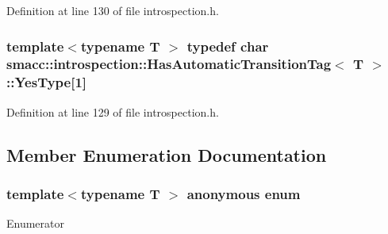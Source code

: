 Definition at line 130 of file introspection.\+h.

\subsubsection[{\texorpdfstring{Yes\+Type}{YesType}}]{\setlength{\rightskip}{0pt plus 5cm}template$<$typename T $>$ typedef char {\bf smacc\+::introspection\+::\+Has\+Automatic\+Transition\+Tag}$<$ T $>$\+::Yes\+Type\mbox{[}1\mbox{]}\hspace{0.3cm}{\ttfamily [private]}}\hypertarget{classsmacc_1_1introspection_1_1HasAutomaticTransitionTag_a750a08a185de0fa20331ba7cfc531dde}{}\label{classsmacc_1_1introspection_1_1HasAutomaticTransitionTag_a750a08a185de0fa20331ba7cfc531dde}


Definition at line 129 of file introspection.\+h.



\subsection{Member Enumeration Documentation}
\subsubsection[{\texorpdfstring{anonymous enum}{anonymous enum}}]{\setlength{\rightskip}{0pt plus 5cm}template$<$typename T $>$ anonymous enum}\hypertarget{classsmacc_1_1introspection_1_1HasAutomaticTransitionTag_aa4d176f174bc660b4705a0ff3874d4ac}{}\label{classsmacc_1_1introspection_1_1HasAutomaticTransitionTag_aa4d176f174bc660b4705a0ff3874d4ac}
\begin{Desc}
\item[Enumerator]\par
\begin{description}
\item[{\em 
value\hypertarget{classsmacc_1_1introspection_1_1HasAutomaticTransitionTag_aa4d176f174bc660b4705a0ff3874d4aca4e813bb149aec14797ea59791542e845}{}\label{classsmacc_1_1introspection_1_1HasAutomaticTransitionTag_aa4d176f174bc660b4705a0ff3874d4aca4e813bb149aec14797ea59791542e845}
}]\end{description}
\end{Desc}


